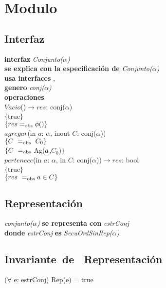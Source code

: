 \section*{Modulo }

\subsection*{Interfaz}
\textbf{interfaz} \textit{Conjunto($\alpha$)}\\
\textbf{se explica con la especificaci\'on de} \textit{Conjunto($\alpha$)}\\
\textbf{usa interfaces} , \\
\textbf{genero} \textit{conj($\alpha$)}\\

\textbf{operaciones}\\

$Vacio$()$\longrightarrow res$: conj($\alpha$)\\
$\{$true$\}$\\
$\{{res} =_{\mathrm{obs}} \phi()\}$\\

$agregar$(in $a$: $\alpha$, inout $C$: conj($\alpha$))\\
$\{\sombreritoWide{C}\ \igobs\ C_0\}$\\
$\{{C}\ =_{\mathrm{obs}}$ Ag(${a}$,$C_0$)$\}$\\

$pertenece$(in $a$: $\alpha$, in $C$: conj($\alpha$))$\longrightarrow res$: bool\\
$\{$true$\}$\\
$\{{res}\ =_{\mathrm{obs}} {a}\in {C}\}$\\

\subsection*{Representaci\'on}
\textit{conjunto($\alpha$)} \textbf{se representa con} \textit{estrConj}\\
\textbf{donde} \textit{estrConj} \textbf{es} \textit{SecuOrdSinRep($\alpha$)}\\

\subsection*{Invariante\ de \ Representaci\'on}
\vspace{11pt}
($\forall$ e: estrConj) Rep(e) = true
\vspace{33pt}

